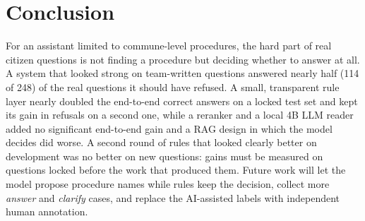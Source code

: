 \section{Conclusion}

For an assistant limited to commune-level procedures, the hard part of real citizen questions is not finding a procedure but deciding
whether to answer at all. A system that looked strong on team-written questions answered nearly half (114 of 248) of the real questions it
should have refused. A small, transparent rule layer nearly doubled the end-to-end correct answers on a locked test set and kept its gain in refusals
on a second one, while a reranker and a local 4B LLM reader added no significant end-to-end gain and a RAG design in which the model decides did worse. A second round of
rules that looked clearly better on development was no better on new questions: gains must be measured on questions locked before the work
that produced them. Future work will let the model propose procedure names while rules keep the decision, collect more \emph{answer} and
\emph{clarify} cases, and replace the AI-assisted labels with independent human annotation.
